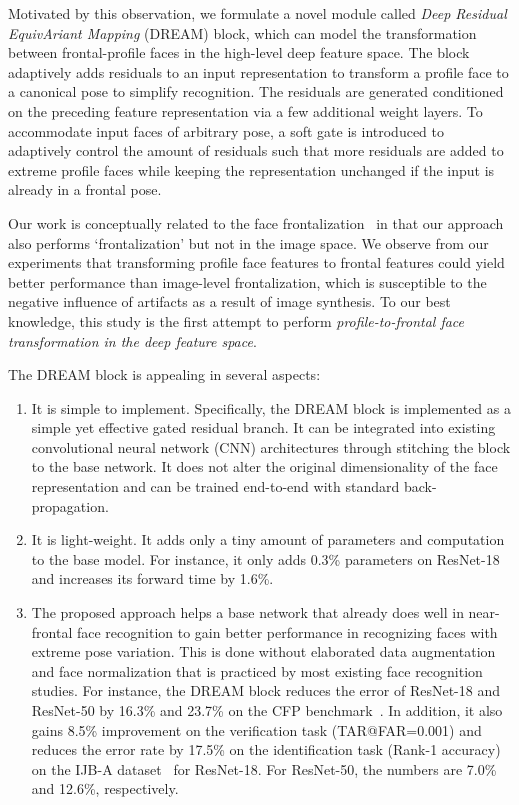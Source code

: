 \documentclass[10pt,twocolumn,letterpaper]{article}
\begin{document}
Motivated by this observation, we formulate a novel module called \textit{Deep Residual EquivAriant Mapping} (DREAM) block, which can model the transformation between frontal-profile faces in the high-level deep feature space. The block adaptively adds residuals to an input representation to transform a profile face to a canonical pose to simplify recognition. The residuals are generated conditioned on the preceding feature representation via a few additional weight layers. 
To accommodate input faces of arbitrary pose, a soft gate is introduced to adaptively control the amount of residuals such that more residuals are added to extreme profile faces while keeping the representation unchanged if the input is already in a frontal pose.

Our work is conceptually related to the face frontalization~\cite{tran2017disentangled} in that our approach also performs `frontalization' but not in the image space. We observe from our experiments that transforming profile face features to frontal features could yield better performance than image-level frontalization, which is susceptible to the negative influence of artifacts as a result of image synthesis.
To our best knowledge, this study is the first attempt to perform \textit{profile-to-frontal face transformation in the deep feature space}.

The DREAM block is appealing in several aspects:
\begin{enumerate}[noitemsep, topsep=0pt]
\itemsep0em 
\item It is simple to implement. Specifically, the DREAM block is implemented as a simple yet effective gated residual branch. It can be integrated into existing convolutional neural network (CNN) architectures through stitching the block to the base network. It does not alter the original dimensionality of the face representation and can be trained end-to-end with standard back-propagation. 
\item It is light-weight. It adds only a tiny amount of parameters and computation to the base model.  For instance, it only adds  0.3\% parameters on ResNet-18 and increases its forward time by 1.6\%.
\item The proposed approach helps a base network that already does well in near-frontal face recognition to gain better performance in recognizing faces with extreme pose variation. This is done without elaborated data augmentation and face normalization that is practiced by most existing face recognition studies. For instance, the DREAM block reduces the error of ResNet-18 and ResNet-50 by 16.3\% and 23.7\% on the CFP benchmark~\cite{sengupta2016frontal}. In addition, it also gains 8.5\% improvement on the verification task (TAR@FAR=0.001) and reduces the error rate by 17.5\% on the identification task (Rank-1 accuracy) on the IJB-A dataset~\cite{chen2016unconstrained} for ResNet-18. For ResNet-50, the numbers are 7.0\% and 12.6\%, respectively.
\end{enumerate}
\end{document}
